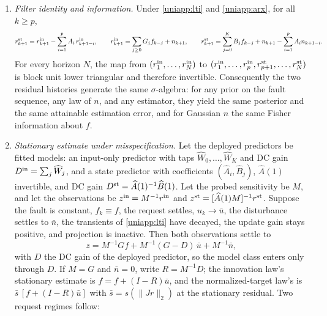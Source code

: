 \begin{proposition}
\label{uniapp:firarx-prop}
\begin{enumerate}[leftmargin=1.5em,itemsep=1pt,label=(\roman*)]
\item\emph{Filter identity and information.}
Under \eqref{uniapp:lti} and \eqref{uniapp:arx}, for all $k\ge p$,
\begin{equation}
 r^{\rm st}_{k+1}=r^{\rm in}_{k+1}-\sum_{i=1}^{p}A_i\,r^{\rm in}_{k+1-i},
 \qquad
 r^{\rm in}_{k+1}=\sum_{j\ge0}G_jf_{k-j}+n_{k+1},\qquad
 r^{\rm st}_{k+1}=\sum_{j=0}^{K}B_jf_{k-j}+n_{k+1}-\sum_{i=1}^{p}A_in_{k+1-i}.
 \label{uniapp:filteridentity}
\end{equation}
For every horizon $N$, the map from $(r^{\rm in}_1,\dots,r^{\rm in}_N)$ to
$(r^{\rm in}_1,\dots,r^{\rm in}_p,r^{\rm st}_{p+1},\dots,r^{\rm st}_N)$ is
block unit lower triangular and therefore invertible. Consequently the two
residual histories generate the same $\sigma$-algebra: for any prior on the
fault sequence, any law of $n$, and any estimator, they yield the same
posterior and the same attainable estimation error, and for Gaussian $n$ the
same Fisher information about $f$.
\item\emph{Stationary estimate under misspecification.}
Let the deployed predictors be fitted models: an input-only predictor with taps
$\widehat W_0,\dots,\widehat W_K$ and DC gain $D^{\rm in}=\sum_j\widehat W_j$,
and a state predictor with coefficients $(\widehat A_i,\widehat B_j)$,
$\widehat A(1)$ invertible, and DC gain
$D^{\rm st}=\widehat A(1)^{-1}\widehat B(1)$. Let the probed sensitivity be
$M$, and let the observations be $z^{\rm in}=M^{-1}r^{\rm in}$ and
$z^{\rm st}=[\widehat A(1)M]^{-1}r^{\rm st}$. Suppose the fault is constant,
$f_k\equiv f$, the request settles, $u_k\to\bar u$, the disturbance settles to
$\bar n$, the transients of \eqref{uniapp:lti} have decayed, the update gain
stays positive, and projection is inactive. Then both observations settle to
\begin{equation}
 z=M^{-1}Gf+M^{-1}(G-D)\,\bar u+M^{-1}\bar n,
 \label{uniapp:stationaryobs}
\end{equation}
with $D$ the DC gain of the deployed predictor, so the model class enters
only through $D$. If $M=G$ and $\bar n=0$, write $R=M^{-1}D$; the innovation
law's stationary estimate is $\hat f=f+(I-R)\bar u$, and the
normalized-target law's is $\bar s\,[f+(I-R)\bar u]$ with $\bar s=s(\|Jr\|_2)$
at the stationary residual. Two request regimes follow:
\begin{align}

\end{align}
\end{enumerate}
\end{proposition}

